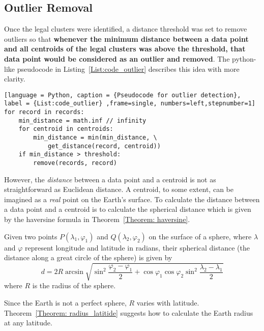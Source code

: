 \subsection{Outlier Removal}
Once the legal clusters were identified, a distance threshold was set to remove outliers so that \textbf{whenever the minimum distance between a data point and all centroids of the legal clusters was above the threshold, that data point would be considered as an outlier and removed}. The python-like pseudocode in Listing~\ref{List:code_outlier} describes this idea with more clarity.

\begin{lstlisting}[language = Python, caption = {Pseudocode for outlier detection}, label = {List:code_outlier} ,frame=single, numbers=left,stepnumber=1]
for record in records:
	min_distance = math.inf // infinity
	for centroid in centroids:
		min_distance = min(min_distance, \
			get_distance(record, centroid))
	if min_distance > threshold:
		remove(records, record)
\end{lstlisting}

However, the \emph{distance} between a data point and a centroid is not as straightforward as Euclidean distance. A centroid, to some extent, can be imagined as a \emph{real} point on the Earth's surface. To calculate the distance between a data point and a centroid is to calculate the spherical distance which is given by the haversine formula in Theorem~\ref{Theorem: haversine}. 

\begin{theorem}\label{Theorem: haversine}
Given two points $P(\lambda_1,\varphi_1)$ and $Q(\lambda_2,\varphi_2)$ on the surface of a sphere, where $\lambda$ and $\varphi$ represent longitude and latitude in radians, their spherical distance (the distance along a great circle of the sphere) is given by\cite{FI06}
\begin{equation}
d = 2R\arcsin{\sqrt{\sin^2\frac{\varphi_2 - \varphi_1}{2} + \cos\varphi_1\cos\varphi_2\sin^2\frac{\lambda_2 - \lambda_1}{2}}} 
\end{equation}
where $R$ is the radius of the sphere. 
\end{theorem}

Since the Earth is not a perfect sphere, $R$ varies with latitude. Theorem~\ref{Theorem: radius_latitide} suggests how to calculate the Earth radius at any latitude. 

